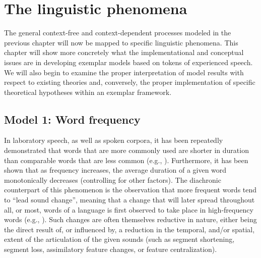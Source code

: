 \chapter{The linguistic phenomena}\label{ch:The-Linguistic-Phenomena}

The general context-free and context-dependent processes modeled in
the previous chapter will now be mapped to specific linguistic phenomena.
This chapter will show more concretely what the implementational and
conceptual issues are in developing exemplar models based on tokens
of experienced speech. We will also begin to examine the proper interpretation
of model results with respect to existing theories and, conversely,
the proper implementation of specific theoretical hypotheses within
an exemplar framework. 

\section{\label{subsec:Word-Frequency}Model 1: Word frequency}

In laboratory speech, as well as spoken corpora, it has been repeatedly
demonstrated that words that are more commonly used are shorter in
duration than comparable words that are less common (e.g., \citealt{Bybee2001,Bybee2002,Bybee2006}).
Furthermore, it has been shown that as frequency increases, the average
duration of a given word monotonically decreases (controlling for
other factors). The diachronic counterpart of this phenomenon is the
observation that more frequent words tend to “lead sound change”,
meaning that a change that will later spread throughout all, or most,
words of a language is first observed to take place in high-frequency
words (e.g., \citealt{Phillips1984}). Such changes are often themselves
reductive in nature, either being the direct result of, or influenced
by, a reduction in the temporal, and/or spatial, extent of the articulation
of the given sounds (such as segment shortening, segment loss, assimilatory
feature changes, or feature centralization).

